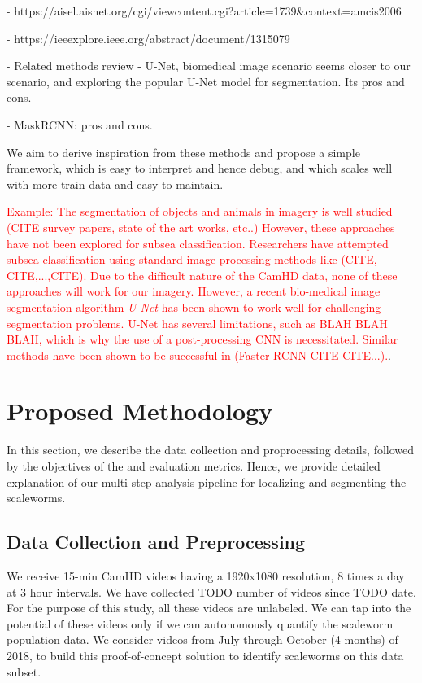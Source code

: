 \documentclass[10pt,twocolumn,letterpaper]{article}
\begin{document}
    - https://aisel.aisnet.org/cgi/viewcontent.cgi?article=1739&context=amcis2006
 
    - https://ieeexplore.ieee.org/abstract/document/1315079

- Related methods review
    - U-Net, biomedical image scenario seems closer to our scenario, and exploring the popular U-Net model for segmentation. Its pros and cons.

    - MaskRCNN: pros and cons.

    We aim to derive inspiration from these methods and propose a simple framework, which is easy to interpret and hence debug, and which scales well with more train data and easy to maintain.
    
\textcolor{red}{Example: The segmentation of objects and animals in imagery is well studied (CITE survey papers, state of the art works, etc..) However, these approaches have not been explored for subsea classification. Researchers have attempted subsea classification using standard image processing methods like (CITE, CITE,...,CITE). Due to the difficult nature of the CamHD data, none of these approaches will work for our imagery. However, a recent bio-medical image segmentation algorithm \textit{U-Net} has been shown to work well for challenging segmentation problems. U-Net has several limitations, such as BLAH BLAH BLAH, which is why the use of a post-processing CNN is necessitated. Similar methods have been shown to be successful in (Faster-RCNN CITE CITE...).}.

\section{Proposed Methodology}

In this section, we describe the data collection and proprocessing details, followed by the objectives of the and evaluation metrics. Hence, we provide detailed explanation of our multi-step analysis pipeline for localizing and segmenting the scaleworms.

\subsection{Data Collection and Preprocessing}
We receive 15-min CamHD videos having a 1920x1080 resolution, 8 times a day at 3 hour intervals. We have collected TODO number of videos since TODO date. For the purpose of this study, all these videos are unlabeled. We can tap into the potential of these videos only if we can autonomously quantify the scaleworm population data. We consider videos from July through October (4 months) of 2018, to build this proof-of-concept solution to identify scaleworms on this data subset.
\end{document}
